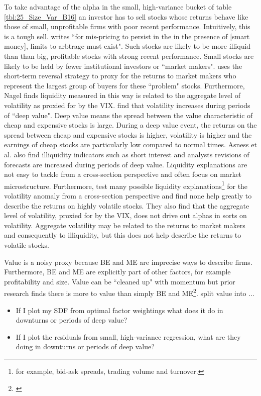 To take advantage of the alpha in the small, high-variance bucket of table
\ref{tbl:25_Size_Var_B16} an investor has to sell stocks whose returns behave
like those of small, unprofitable firms with poor recent performance.
Intuitively, this is a tough sell.
\textcite{nagel2005short} writes ``for mis-pricing to persist in the in the
presence of [smart money], limits to arbtrage must exist".
Such stocks are likely to be more illiquid than than big, profitable stocks
with strong recent performance.
Small stocks are likely to be held by fewer institutional investors or
``market makers".
\textcite{nagel2012evaporating} uses the short-term reversal strategy to proxy
for the returns to market makers who represent the largest group of buyers for
these ``problem" stocks.
Furthermore, Nagel finds liquidity measured in this way is related to the
aggregate level of volatility as proxied for by the VIX.
\textcite{asness2018deep} find that volatility increases during periods of
``deep value".
Deep value means the spread between the value characteristic of cheap and
expensive stocks is large.
During a deep value event, the returns on the spread between cheap and
expensive stocks is higher, volatility is higher and the earnings of cheap
stocks are particularly low compared to normal times.
Asness et al. also find illiquidity indicators such as short
interest and analysts revisions of forecasts are increased during periods of
deep value.
Liquidity explanations are not easy to tackle from a cross-section
perspective and often focus on market microstructure.
Furthermore, \textcite{ang2006cross} test many possible liquidity
explanations\footnote{for example, bid-ask spreads, trading volume and
turnover.} for the volatility anomaly from a cross-section perspective
and find none help greatly to describe the returns on highly volatile stocks.
They also find that the aggregate level of volatility, proxied for by the VIX,
does not drive out alphas in sorts on volatility.
Aggregate volatility may be related to the returns to market makers and
consequently to illiquidity, but this does not help describe the returns to
volatile stocks.

Value is a noisy proxy because BE and ME are imprecise ways to describe firms.
Furthermore, BE and ME are explicitly part of other factors, for example
profitability and size.
Value can be ``cleaned up" with momentum but prior research finds there is more
to value than simply BE and ME\footnote{
\textcite{cohen2003value, daniel2006market, fama2008average}
}.
\textcite{gerakos2017decomposing} split value into ...

\begin{itemize}
  \item If I plot my SDF from optimal factor weightings what does it do in
  downturns or periods of deep value?
  \item If I plot the residuals from small, high-variance regression, what are
  they doing in downturns or periods of deep value?
\end{itemize}
